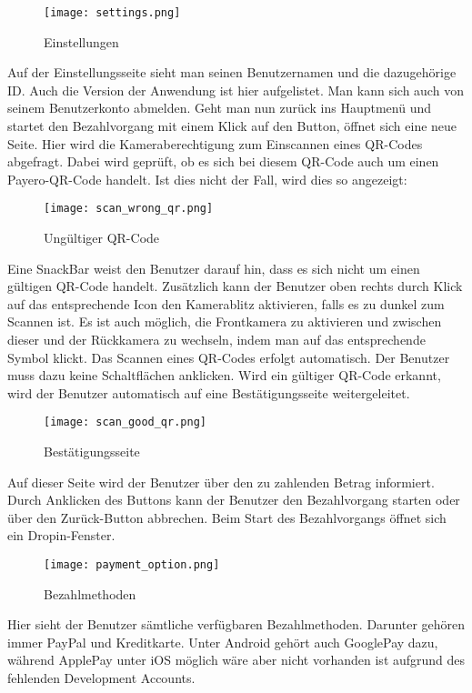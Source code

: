 \begin{figure}[H]
  \centering
  \texttt{[image: settings.png]}
  \caption{Einstellungen}
\end{figure}

Auf der Einstellungsseite sieht man seinen Benutzernamen und die dazugehörige ID.
Auch die Version der Anwendung ist hier aufgelistet.
Man kann sich auch von seinem Benutzerkonto abmelden.
Geht man nun zurück ins Hauptmenü und startet den Bezahlvorgang mit einem Klick auf den Button, öffnet sich eine neue Seite.
Hier wird die Kameraberechtigung zum Einscannen eines QR-Codes abgefragt.
Dabei wird geprüft, ob es sich bei diesem QR-Code auch um einen Payero-QR-Code handelt.
Ist dies nicht der Fall, wird dies so angezeigt:

\begin{figure}[H]
  \centering
  \texttt{[image: scan\_wrong\_qr.png]}
  \caption{Ungültiger QR-Code}
\end{figure}

Eine SnackBar weist den Benutzer darauf hin, dass es sich nicht um einen gültigen QR-Code handelt.
Zusätzlich kann der Benutzer oben rechts durch Klick auf das entsprechende Icon den Kamerablitz aktivieren, falls es zu dunkel zum Scannen ist.
Es ist auch möglich, die Frontkamera zu aktivieren und zwischen dieser und der Rückkamera zu wechseln, indem man auf das entsprechende Symbol klickt.
Das Scannen eines QR-Codes erfolgt automatisch.
Der Benutzer muss dazu keine Schaltflächen anklicken.
Wird ein gültiger QR-Code erkannt, wird der Benutzer automatisch auf eine Bestätigungsseite weitergeleitet.

\begin{figure}[H]
  \centering
  \texttt{[image: scan\_good\_qr.png]}
  \caption{Bestätigungsseite}
\end{figure}

Auf dieser Seite wird der Benutzer über den zu zahlenden Betrag informiert.
Durch Anklicken des Buttons kann der Benutzer den Bezahlvorgang starten oder über den Zurück-Button abbrechen.
Beim Start des Bezahlvorgangs öffnet sich ein Dropin-Fenster.

\begin{figure}[H]
  \centering
  \texttt{[image: payment\_option.png]}
  \caption{Bezahlmethoden}
\end{figure}

Hier sieht der Benutzer sämtliche verfügbaren Bezahlmethoden.
Darunter gehören immer PayPal und Kreditkarte.
Unter Android gehört auch GooglePay dazu, während ApplePay unter iOS möglich wäre aber nicht vorhanden ist aufgrund des fehlenden Development Accounts.


